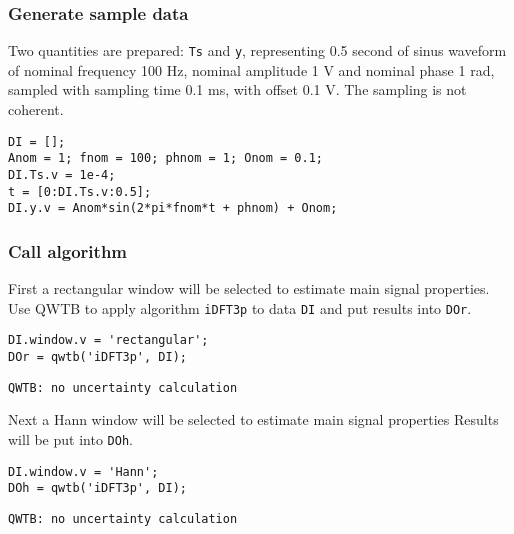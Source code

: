 \startcontents[localtoc]



{}
\subsubsection*{Generate sample data}



Two quantities are prepared: \texttt{Ts} and \texttt{y}, representing 0.5 second of sinus waveform of nominal
frequency 100 Hz, nominal amplitude 1 V and nominal phase 1 rad, sampled with sampling time 0.1
ms, with offset 0.1 V. The sampling is not coherent.

\begin{lstlisting}
DI = [];
Anom = 1; fnom = 100; phnom = 1; Onom = 0.1;
DI.Ts.v = 1e-4;
t = [0:DI.Ts.v:0.5];
DI.y.v = Anom*sin(2*pi*fnom*t + phnom) + Onom;
\end{lstlisting}


{}
\subsubsection*{Call algorithm}



First a rectangular window will be selected to estimate main signal properties. Use QWTB to apply
algorithm \texttt{iDFT3p} to data \texttt{DI} and put results into \texttt{DOr}.

\begin{lstlisting}
DI.window.v = 'rectangular';
DOr = qwtb('iDFT3p', DI);
\end{lstlisting}
\begin{lstlisting}[language={},xleftmargin=5pt,frame=none]
QWTB: no uncertainty calculation

\end{lstlisting}


Next a Hann window will be selected to estimate main signal properties Results will be put into \texttt{DOh}.

\begin{lstlisting}
DI.window.v = 'Hann';
DOh = qwtb('iDFT3p', DI);
\end{lstlisting}
\begin{lstlisting}[language={},xleftmargin=5pt,frame=none]
QWTB: no uncertainty calculation

\end{lstlisting}


